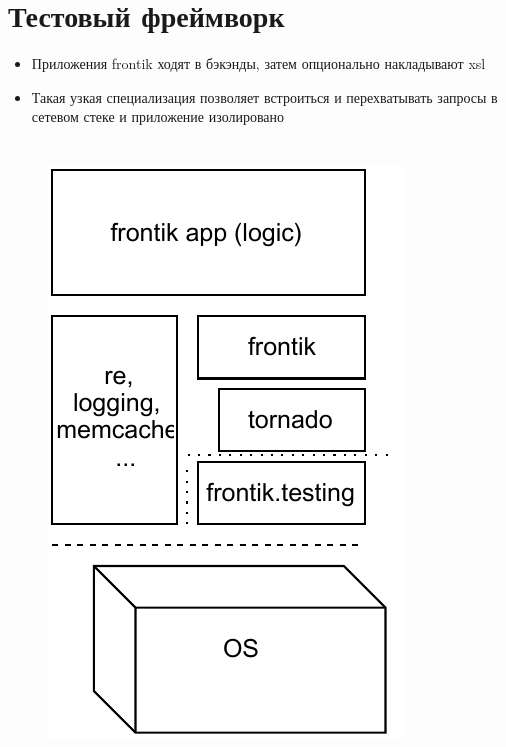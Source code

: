 \documentclass[12pt]{article}
\begin{document}
\section{Тестовый фреймворк}

\begin{itemize}
\item Приложения frontik ходят в бэкэнды, затем опционально накладывают xsl
\item Такая узкая специализация позволяет встроиться и перехватывать запросы в сетевом стеке и приложение изолировано

\end{itemize}

\section{}
\begin{figure}[ht!]
\includegraphics[page=1, scale=1.6]{frontiktesting.pdf}
%
\end{figure}
\end{document}

